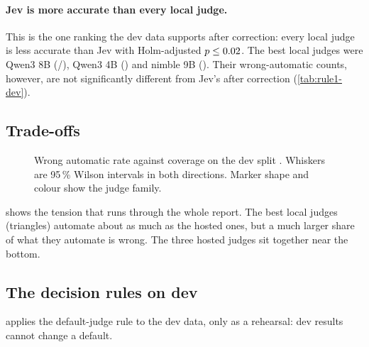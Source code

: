 \paragraph{Jev is more accurate than every local judge.} This is the one ranking the dev data supports
after correction: every local judge is less accurate than Jev with Holm-adjusted $p \le
0.02$. The best local judges were Qwen3 8B (\QwenEightDevAccK/\DevN), Qwen3 4B
(\QwenFourDevAccK) and nimble 9B (\NimbleDevAccK). Their wrong-automatic counts, however, are not
significantly different from Jev's after correction (\cref{tab:rule1-dev}).

\subsection{Trade-offs}




\begin{figure}[htbp]
\centering
{}
\caption{Wrong automatic rate against coverage on the dev split \screen. Whiskers are 95\,\% Wilson
intervals in both directions. Marker shape and colour show the judge family.}
\label{fig:wacov-dev}
\end{figure}

 shows the tension that runs through the whole report. The best local judges (triangles)
automate about as much as the hosted ones, but a much larger share of what they automate is wrong.
The three hosted judges sit together near the bottom.

\subsection{The decision rules on dev}

 applies the default-judge rule to the dev data, only as a rehearsal: dev results
cannot change a default.

\begin{table}[htbp]
\centering\small
\caption{Rule 1 on the dev split \screen: each candidate minus Jev. Positive accuracy differences and
negative wrong-automatic differences favour the candidate. Bold Holm $p$ values are $\le 0.05$. Gates:
(a) non-inferior on both endpoints, (b) significantly better on one, (c) p95 $\le$
\RuleOneMaxPninetyfive\,ms, (d) cost $\le$ \RuleOneCostX$\times$ Jev.}
\label{tab:rule1-dev}

\end{table}

